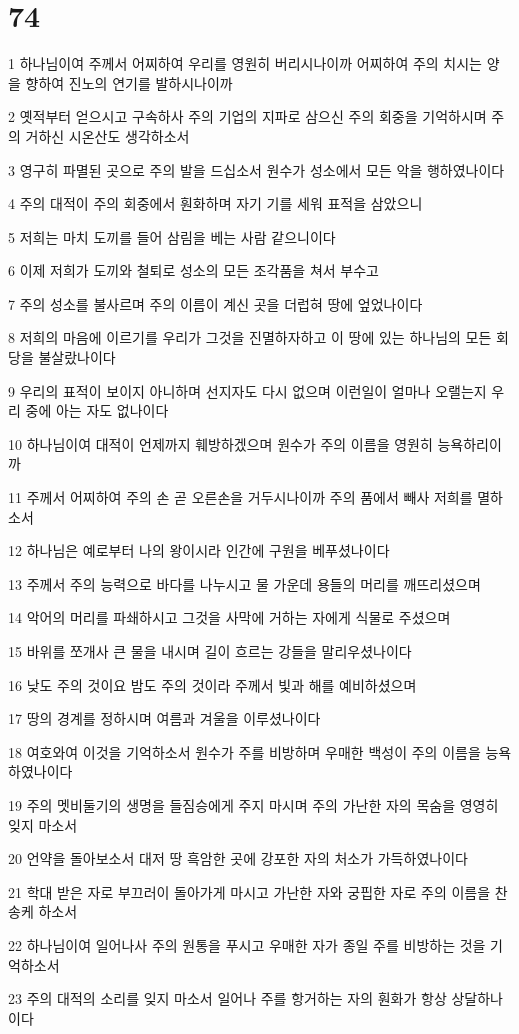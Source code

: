 \chapter{74}

\par 1 하나님이여 주께서 어찌하여 우리를 영원히 버리시나이까 어찌하여 주의 치시는 양을 향하여 진노의 연기를 발하시나이까
\par 2 옛적부터 얻으시고 구속하사 주의 기업의 지파로 삼으신 주의 회중을 기억하시며 주의 거하신 시온산도 생각하소서
\par 3 영구히 파멸된 곳으로 주의 발을 드십소서 원수가 성소에서 모든 악을 행하였나이다
\par 4 주의 대적이 주의 회중에서 훤화하며 자기 기를 세워 표적을 삼았으니
\par 5 저희는 마치 도끼를 들어 삼림을 베는 사람 같으니이다
\par 6 이제 저희가 도끼와 철퇴로 성소의 모든 조각품을 쳐서 부수고
\par 7 주의 성소를 불사르며 주의 이름이 계신 곳을 더럽혀 땅에 엎었나이다
\par 8 저희의 마음에 이르기를 우리가 그것을 진멸하자하고 이 땅에 있는 하나님의 모든 회당을 불살랐나이다
\par 9 우리의 표적이 보이지 아니하며 선지자도 다시 없으며 이런일이 얼마나 오랠는지 우리 중에 아는 자도 없나이다
\par 10 하나님이여 대적이 언제까지 훼방하겠으며 원수가 주의 이름을 영원히 능욕하리이까
\par 11 주께서 어찌하여 주의 손 곧 오른손을 거두시나이까 주의 품에서 빼사 저희를 멸하소서
\par 12 하나님은 예로부터 나의 왕이시라 인간에 구원을 베푸셨나이다
\par 13 주께서 주의 능력으로 바다를 나누시고 물 가운데 용들의 머리를 깨뜨리셨으며
\par 14 악어의 머리를 파쇄하시고 그것을 사막에 거하는 자에게 식물로 주셨으며
\par 15 바위를 쪼개사 큰 물을 내시며 길이 흐르는 강들을 말리우셨나이다
\par 16 낮도 주의 것이요 밤도 주의 것이라 주께서 빛과 해를 예비하셨으며
\par 17 땅의 경계를 정하시며 여름과 겨울을 이루셨나이다
\par 18 여호와여 이것을 기억하소서 원수가 주를 비방하며 우매한 백성이 주의 이름을 능욕하였나이다
\par 19 주의 멧비둘기의 생명을 들짐승에게 주지 마시며 주의 가난한 자의 목숨을 영영히 잊지 마소서
\par 20 언약을 돌아보소서 대저 땅 흑암한 곳에 강포한 자의 처소가 가득하였나이다
\par 21 학대 받은 자로 부끄러이 돌아가게 마시고 가난한 자와 궁핍한 자로 주의 이름을 찬송케 하소서
\par 22 하나님이여 일어나사 주의 원통을 푸시고 우매한 자가 종일 주를 비방하는 것을 기억하소서
\par 23 주의 대적의 소리를 잊지 마소서 일어나 주를 항거하는 자의 훤화가 항상 상달하나이다

